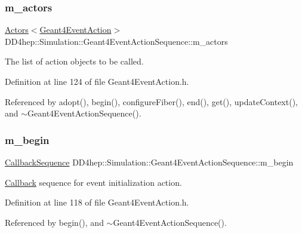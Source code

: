 \subsubsection{\texorpdfstring{m\+\_\+actors}{m\_actors}}
{\footnotesize\ttfamily \hyperlink{class_d_d4hep_1_1_simulation_1_1_geant4_action_1_1_actors}{Actors}$<$\hyperlink{class_d_d4hep_1_1_simulation_1_1_geant4_event_action}{Geant4\+Event\+Action}$>$ D\+D4hep\+::\+Simulation\+::\+Geant4\+Event\+Action\+Sequence\+::m\+\_\+actors\hspace{0.3cm}{\ttfamily [protected]}}



The list of action objects to be called. 



Definition at line 124 of file Geant4\+Event\+Action.\+h.



Referenced by adopt(), begin(), configure\+Fiber(), end(), get(), update\+Context(), and $\sim$\+Geant4\+Event\+Action\+Sequence().

\hypertarget{class_d_d4hep_1_1_simulation_1_1_geant4_event_action_sequence_a59a49de5aff7aac8379f5325e2584ad6}{}\label{class_d_d4hep_1_1_simulation_1_1_geant4_event_action_sequence_a59a49de5aff7aac8379f5325e2584ad6} 
\subsubsection{\texorpdfstring{m\+\_\+begin}{m\_begin}}
{\footnotesize\ttfamily \hyperlink{struct_d_d4hep_1_1_callback_sequence}{Callback\+Sequence} D\+D4hep\+::\+Simulation\+::\+Geant4\+Event\+Action\+Sequence\+::m\+\_\+begin\hspace{0.3cm}{\ttfamily [protected]}}



\hyperlink{class_d_d4hep_1_1_callback}{Callback} sequence for event initialization action. 



Definition at line 118 of file Geant4\+Event\+Action.\+h.



Referenced by begin(), and $\sim$\+Geant4\+Event\+Action\+Sequence().

